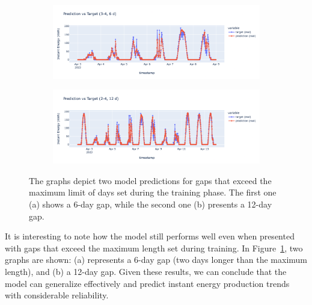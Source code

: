 \begin{figure}[H]
	\centering
	\begin{subfigure}{\textwidth}
		\centering
		\includegraphics[width=.9\textwidth]{chapters/3_models/imgs/grrun/eval/grruneval6buco.png}
		\caption{}
	\end{subfigure}
	\begin{subfigure}{\textwidth}
		\centering
		\includegraphics[width=.9\textwidth]{chapters/3_models/imgs/grrun/eval/grruneval12buco.png}
		\caption{}
	\end{subfigure}
	\caption{The graphs depict two model predictions for gaps that exceed the maximum limit of days set during the training phase. The first one (a) shows a 6-day gap, while the second one (b) presents a 12-day gap.}
	\label{fig:grrunevalbucogrande}
\end{figure}

It is interesting to note how the model still performs well even
when presented with gaps that exceed the maximum length set
during training.
In Figure~\ref{fig:grrunevalbucogrande}, two graphs are shown:
(a) represents a 6-day gap (two days longer than the maximum length),
and (b) a 12-day gap.
Given these results, we can conclude that the model can
generalize effectively and predict instant energy production
trends with considerable reliability.


